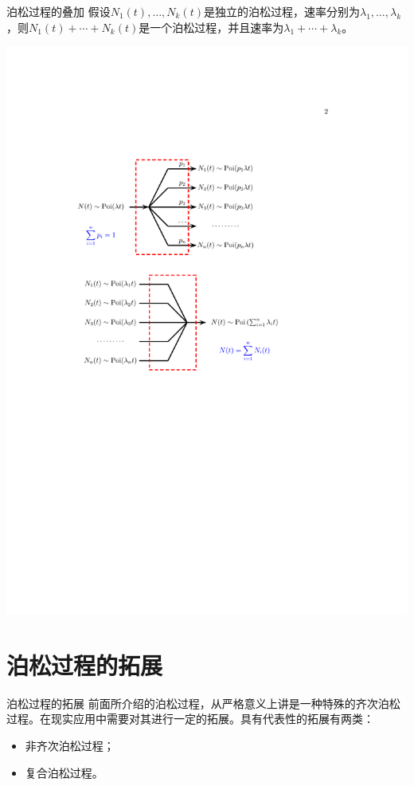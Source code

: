 \documentclass[t]{beamer}
\begin{document}
\begin{frame}{泊松过程的叠加}
假设$N_1(t),\ldots, N_k(t)$是独立的泊松过程，速率分别为$\lambda_1,\ldots,\lambda_k$，则$N_1(t)+\cdots+N_k(t)$是一个泊松过程，并且速率为$\lambda_1+\cdots+\lambda_k$。
\begin{center}
    \includegraphics[scale=0.85]{fig/poisson3.pdf}
\end{center}
\end{frame}

\section{泊松过程的拓展}
\begin{frame}{泊松过程的拓展}
    前面所介绍的泊松过程，从严格意义上讲是一种特殊的齐次泊松过程。在现实应用中需要对其进行一定的拓展。具有代表性的拓展有两类：
    \begin{itemize}
        \item     非齐次泊松过程；
        \item     复合泊松过程。
    \end{itemize}

\end{frame}
\end{document}
